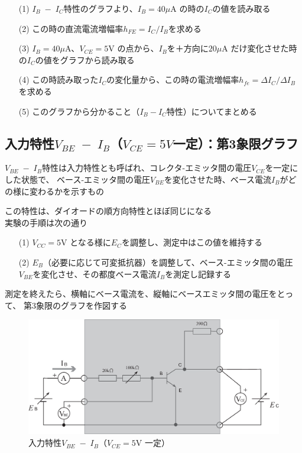 \documentclass[uplatex,a4paper,11pt,oneside,openany]{jsbook}
\begin{document}
\begin{enumerate}
\item[(1)] $I_B\;-\;I_C$特性のグラフより、$I_B=40\mu$A の時の$I_C$の値を読み取る\\
\item[(2)] この時の直流電流増幅率$h_{FE}=I_C/I_B$を求める\\
\item[(3)] $I_B=40\mu$A、$V_{CE}=5$V の点から、$I_B$を＋方向に$20\mu$A だけ変化させた時の$I_C$の値をグラフから読み取る\\
\item[(4)] この時読み取った$I_C$の変化量から、この時の電流増幅率$h_{fe}=\Delta I_C/\Delta I_B$を求める\\
\item[(5)] このグラフから分かること（$I_B-I_C$特性）についてまとめる
\end{enumerate}

\newpage

\subsection{入力特性$V_{BE}\;-\;I_B$（$V_{CE}=5V$一定）：第3象限グラフ}

$V_{BE}\;-\;I_B$特性は入力特性とも呼ばれ、コレクタ-エミッタ間の電圧$V_{CE}$を一定にした状態で、
ベース-エミッタ間の電圧$V_{BE}$を変化させた時、ベース電流$I_B$がどの様に変わるかを示すもの

この特性は、ダイオードの順方向特性とほぼ同じになる\\

実験の手順は次の通り

\begin{enumerate}
\item[(1)] $V_{CC}=5$V となる様に$E_C$を調整し、測定中はこの値を維持する
\item[(2)] $E_B$（必要に応じて可変抵抗器）を調整して、ベース-エミッタ間の電圧$V_{BE}$を変化させ、その都度ベース電流$I_B$を測定し記録する
\end{enumerate}

測定を終えたら、横軸にベース電流を、縦軸にベースエミッタ間の電圧をとって、
第3象限のグラフを作図する

\vfill

\begin{figure}[H]
  \centering
   \includegraphics[keepaspectratio, scale=0.45, angle=0]
               {figs/eps/ex3.eps}
               \caption{入力特性$V_{BE}\;-\;I_B$（$V_{CE}=5$V 一定）}
               \label{fig:ex3}
\end{figure}
\end{document}
